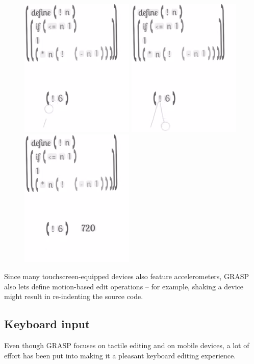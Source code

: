 \documentclass[sigconf]{acmart}
\begin{document}
\begin{itemize}
\begin{figure}[H]
  \centering%
  \includegraphics[width=.32\linewidth,frame]{eval-1}\hfill%
  \includegraphics[width=.32\linewidth,frame]{eval-2}\hfill%
  \includegraphics[width=.32\linewidth,frame]{eval-3}\hfill%
\end{figure}

\end{itemize}

Since many touchscreen-equipped devices also
feature accelerometers, GRASP also lets define
motion-based edit operations -- for example, shaking
a device might result in re-indenting the source
code.

\subsection{Keyboard input}

Even though GRASP focuses on tactile editing
and on mobile devices, a lot of effort has been
put into making it a pleasant keyboard editing
experience.
\end{document}

